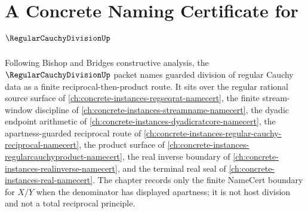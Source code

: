 \chapter{A Concrete Naming Certificate for $\RegularCauchyDivisionUp$}
\label{ch:concrete-instances-regular-cauchy-division-namecert}

Following Bishop and Bridges constructive analysis, the $\RegularCauchyDivisionUp$ packet names guarded division of regular Cauchy data as a finite reciprocal-then-product route. It sits over the regular rational source surface of \autoref{ch:concrete-instances-regseqrat-namecert}, the finite stream-window discipline of \autoref{ch:concrete-instances-streamname-namecert}, the dyadic endpoint arithmetic of \autoref{ch:concrete-instances-dyadicratcore-namecert}, the apartness-guarded reciprocal route of \autoref{ch:concrete-instances-regular-cauchy-reciprocal-namecert}, the product surface of \autoref{ch:concrete-instances-regularcauchyproduct-namecert}, the real inverse boundary of \autoref{ch:concrete-instances-realinverse-namecert}, and the terminal real seal of \autoref{ch:concrete-instances-real-namecert}. The chapter records only the finite NameCert boundary for $X/Y$ when the denominator has displayed apartness; it is not host division and not a total reciprocal principle.


